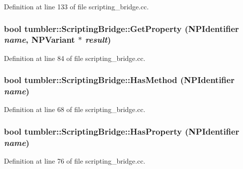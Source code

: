 Definition at line 133 of file scripting\_\-bridge.cc.

\hypertarget{classtumbler_1_1_scripting_bridge_a7f8c653d8a5cb632eae37e1d59459c31}{
\subsubsection[{GetProperty}]{\setlength{\rightskip}{0pt plus 5cm}bool tumbler::ScriptingBridge::GetProperty (NPIdentifier {\em name}, \/  NPVariant $\ast$ {\em result})}}
\label{classtumbler_1_1_scripting_bridge_a7f8c653d8a5cb632eae37e1d59459c31}


Definition at line 84 of file scripting\_\-bridge.cc.

\hypertarget{classtumbler_1_1_scripting_bridge_acd4789c8a9668e86ad02949ac7e88481}{
\subsubsection[{HasMethod}]{\setlength{\rightskip}{0pt plus 5cm}bool tumbler::ScriptingBridge::HasMethod (NPIdentifier {\em name})}}
\label{classtumbler_1_1_scripting_bridge_acd4789c8a9668e86ad02949ac7e88481}


Definition at line 68 of file scripting\_\-bridge.cc.

\hypertarget{classtumbler_1_1_scripting_bridge_af5fea670d935111ef96b2ecc3adc8576}{
\subsubsection[{HasProperty}]{\setlength{\rightskip}{0pt plus 5cm}bool tumbler::ScriptingBridge::HasProperty (NPIdentifier {\em name})}}
\label{classtumbler_1_1_scripting_bridge_af5fea670d935111ef96b2ecc3adc8576}


Definition at line 76 of file scripting\_\-bridge.cc.

